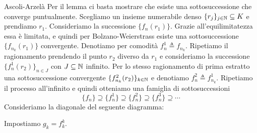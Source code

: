 \documentclass[a4paper]{article}
\begin{document}
\begin{radioactive}
\begin{snippetproof}{Ascoli-Arzelà}
    Per il lemma ci basta mostrare che esiste una sottosuccessione
    che converge puntualmente.
    Scegliamo un insieme numerabile denso \(\{r_j\}_{j\in\mathbb{N}}\subseteq K\) e prendiamo \(r_1\).
    Consideriamo la successione \(\{f_n(r_1)\}\).
    Grazie all'equilimitatezza essa è limitata, e quindi per
    Bolzano-Weierstrass esiste una sottosuccessione \(\{f_{n_k}(r_1)\}\)
    convergente. Denotiamo per comodità \(f^1_n \triangleq f_{n_k}\).
    Ripetiamo il ragionamento prendendo il punto \(r_2\)
    diverso da \(r_1\) e consideriamo la successione \(\{f^1_n(r_2)\}_{n \in J}\)
    con \(J \subseteq \mathbb{N}\) infinito.
    Per lo stesso ragionamento di prima estratto una sottosuccessione convergente
    \(\{f^2_{n_k}(r_2)\}_{k\in\mathbb{N}}\) e denotiamo \(f^2_n \triangleq f^1_{n_k}\).
    Ripetiamo il processo all'infinito e quindi otteniamo una famiglia di sottosuccessioni
    \[
        \{f_n\}\supseteq\{f_n^1\}\supseteq\{f_n^2\}\supseteq\{f_n^3\}\supseteq\cdots
    \]
    Consideriamo la diagonale del seguente diagramma:
    \begin{center}
    \end{center}
    Impostiamo
    \(g_k = f_k^k\).

\end{snippetproof}
\end{radioactive}
\end{document}
